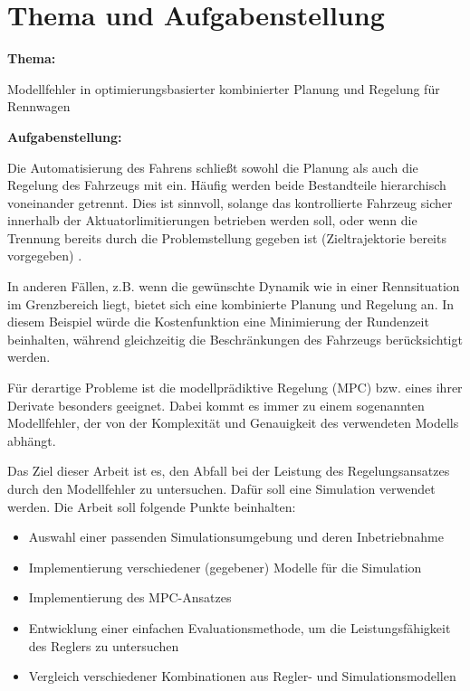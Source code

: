 

\chapter*{Thema und Aufgabenstellung}
\textbf{Thema:}\par\smallskip

 Modellfehler in optimierungsbasierter kombinierter Planung und Regelung für Rennwagen

\textbf{Aufgabenstellung:}\par\smallskip
\par\smallskip  
Die Automatisierung des Fahrens schließt sowohl die Planung als auch die Regelung des Fahrzeugs mit ein. Häufig werden beide Bestandteile hierarchisch voneinander getrennt. Dies ist sinnvoll, solange das kontrollierte Fahrzeug sicher innerhalb der Aktuator\-li\-mi\-tie\-rungen betrieben werden soll, oder wenn die Trennung bereits durch die Problemstellung gegeben ist (Zieltrajektorie bereits vorgegeben) \cite{Williams2016AggressiveDW}.  

In anderen Fällen, z.B. wenn die gewünschte Dynamik wie in einer Rennsituation im Grenzbereich liegt, bietet sich eine kombinierte Planung und Regelung an. In diesem Beispiel würde die Kostenfunktion eine Minimierung der Rundenzeit beinhalten, während gleichzeitig die Beschränkungen des Fahrzeugs berücksichtigt werden.

Für derartige Probleme ist die modellprädiktive Regelung (MPC) bzw. eines ihrer Derivate besonders geeignet. Dabei kommt es immer zu einem sogenannten Modellfehler, der von der Komplexität und Genauigkeit des verwendeten Modells abhängt.

Das Ziel dieser Arbeit ist es, den Abfall bei der Leistung des Regelungsansatzes durch den Modellfehler zu untersuchen. Dafür soll eine Simulation verwendet werden.
Die Arbeit soll folgende Punkte beinhalten:
\begin{itemize}
\item Auswahl einer passenden Simulationsumgebung und deren Inbetriebnahme
\item Implementierung verschiedener (gegebener) Modelle für die Simulation
\item Implementierung des MPC-Ansatzes
\item Entwicklung einer einfachen Evaluationsmethode, um die Leistungsfähigkeit des Reglers zu untersuchen
\item Vergleich verschiedener Kombinationen aus Regler- und Simulationsmodellen
\end{itemize}